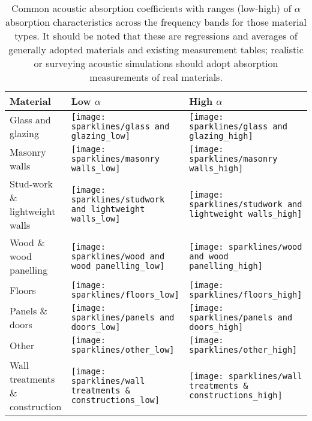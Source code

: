 \begin{table}
\def\widthspark{120pt}
\centering
\caption{Common acoustic absorption coefficients with ranges (low-high) of $\alpha$ absorption characteristics across the frequency bands for those material types. It should be noted that these are regressions and averages of generally adopted materials and existing measurement tables; realistic or surveying acoustic simulations should adopt absorption measurements of real materials.}
\begin{tabular}{lll}
\toprule
\textbf{Material}                  & \textbf{Low $\alpha$}                                                              & \textbf{High $\alpha$}                                                               \\ \midrule
Glass and glazing                  & \texttt{[image: sparklines/glass and glazing\_low]}               & \texttt{[image: sparklines/glass and glazing\_high]}               \\ 
Masonry walls                      & \texttt{[image: sparklines/masonry walls\_low]}                   & \texttt{[image: sparklines/masonry walls\_high]}                   \\ 
Stud-work \& lightweight walls     & \texttt{[image: sparklines/studwork and lightweight walls\_low]}  & \texttt{[image: sparklines/studwork and lightweight walls\_high]}  \\ 
Wood \& wood panelling             & \texttt{[image: sparklines/wood and wood panelling\_low]}         & \texttt{[image: sparklines/wood and wood panelling\_high]}         \\ 
Floors                             & \texttt{[image: sparklines/floors\_low]}                          & \texttt{[image: sparklines/floors\_high]}                          \\ 
Panels \& doors                    & \texttt{[image: sparklines/panels and doors\_low]}                & \texttt{[image: sparklines/panels and doors\_high]}                \\ 
Other                              & \texttt{[image: sparklines/other\_low]}                           & \texttt{[image: sparklines/other\_high]}                           \\ 
Wall treatments \& construction    & \texttt{[image: sparklines/wall treatments \& constructions\_low]} & \texttt{[image: sparklines/wall treatments \& constructions\_high]} \\ 

\end{tabular}
\end{table}
